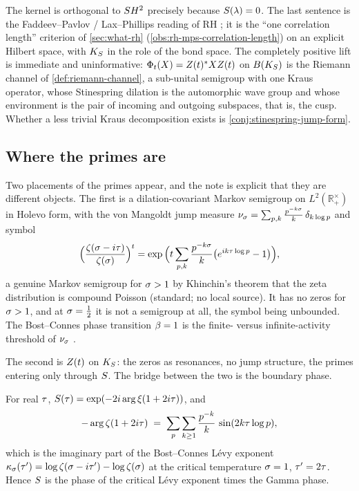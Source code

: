 The kernel is orthogonal to $S H^2$ precisely because $S(\lambda)=0$. The last
sentence is the Faddeev--Pavlov / Lax--Phillips reading of RH
\cite{faddeev1972scattering,laxphillips1976}; it is the ``one correlation length''
criterion of \cref{sec:what-rh} (\cref{obs:rh-mps-correlation-length}) on an explicit
Hilbert space, with $K_S$ in the role of the bond space. The completely positive lift is
immediate and uninformative: $\Phi_{t}(X) = Z(t)^{*}XZ(t)$ on $B(K_S)$ is the
Riemann channel of \cref{def:riemann-channel}, a sub-unital semigroup with one Kraus
operator, whose Stinespring dilation is the automorphic wave group and whose environment
is the pair of incoming and outgoing subspaces, that is, the cusp. Whether a less trivial
Kraus decomposition exists is \cref{conj:stinespring-jump-form}.

\subsection{Where the primes are}

Two placements of the primes appear, and the note is explicit that they are different
objects. The first is a dilation-covariant Markov semigroup on $L^2(\mathbb R_+^\times)$
in Holevo form, with the von Mangoldt jump measure $\nu_{\sigma} =
\sum_{p,k}\frac{p^{-k\sigma}}{k}\,\delta_{k\log p}$ and symbol
\[
  \Big(\frac{\zeta(\sigma-i\tau)}{\zeta(\sigma)}\Big)^{t}
  = \exp\Big(t\sum_{p,k}\frac{p^{-k\sigma}}{k}\big(e^{ik\tau\log p}-1\big)\Big),
\]
a genuine Markov semigroup for $\sigma>1$ by Khinchin's theorem that the zeta distribution
is compound Poisson (standard; no local source). It has no zeros for $\sigma>1$, and at
$\sigma=\frac12$ it is not a semigroup at all, the symbol being unbounded. The Bost--Connes
phase transition $\beta = 1$ is the finite- versus infinite-activity threshold of
$\nu_{\sigma}$ \cite{bostconnes1995}.

The second is $Z(t)$ on $K_S$: the zeros as resonances, no jump structure, the primes
entering only through $S$. The bridge between the two is the boundary phase.

\begin{proposition}
\label{prop:phase-identity}
For real $\tau$, $S(\tau) = \exp(-2i\arg\xi(1+2i\tau))$, and
\[
  -\arg\zeta(1+2i\tau) \;=\; \sum_{p}\sum_{k\ge1}\frac{p^{-k}}{k}\,
  \sin(2k\tau\log p),
\]
which is the imaginary part of the Bost--Connes L\'evy exponent $\kappa_{\sigma}(\tau') =
\log\zeta(\sigma-i\tau')-\log\zeta(\sigma)$ at the critical temperature $\sigma=1$,
$\tau'=2\tau$. Hence $S$ is the phase of the critical L\'evy exponent times the
Gamma phase.
\end{proposition}

